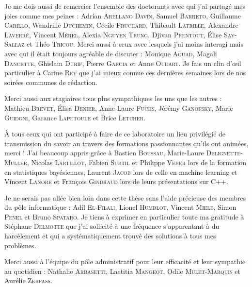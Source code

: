 Je me dois aussi de remercier l'ensemble des doctorants avec qui j'ai partagé mes joies comme mes peines : 
Adr\'ian \textsc{Arellano Dav\'in}, 
Samuel \textsc{Barreto},
Guillaume \textsc{Carillo},
Wandrille \textsc{Duchemin},
Cécile \textsc{Fruchard},
Thibault \textsc{Latrille},
Alexandre \textsc{Laverré},
Vincent \textsc{Mérel},
Alexia \textsc{Nguyen Trung},
Djivan \textsc{Prentout},
\'Elise \textsc{Say-Sallaz} et
Théo \textsc{Tricou}.
Merci aussi à ceux avec lesquels j'ai moins interagi mais avec qui il était toujours agréable de discuter : 
Monique \textsc{Aouad},
Magali \textsc{Dancette},
Ghislain \textsc{Durif},
Pierre \textsc{Garcia} et Anne \textsc{Oudart}.
Je fais un clin d'œil particulier à Carine \textsc{Rey} que j'ai mieux connue ces dernières semaines lors de nos soirées communes de rédaction.

Merci aussi aux stagiaires tous plus sympathiques les uns que les autres : Mathieu \textsc{Brevet}, \'Elisa \textsc{Denier}, Anne-Laure \textsc{Fuchs}, Jérémy \textsc{Ganofsky}, Marie \textsc{Guidoni}, Garance \textsc{Lapetoule} et Brice \textsc{Letcher}.

\`A tous ceux qui ont participé à faire de ce laboratoire un lieu privilégié de transmission du savoir au travers des formations passionnantes qu'ils ont animées, merci ! J'ai beaucoup appris gr\^ace à
Bastien \textsc{Boussau}, Marie-Laure \textsc{Delignette-Muller}, Nicolas \textsc{Lartillot}, Fabien \textsc{Subtil} et Philippe \textsc{Veber} lors de la formation en statistiques bayésiennes, Laurent \textsc{Jacob} lors de celle en machine learning et Vincent \textsc{Lanore} et François \textsc{Gindraud} lors de leurs présentations sur C++.



Je ne serais pas allée bien loin dans cette thèse sans l'aide précieuse des membres du pôle informatique : 
Adil \textsc{El-Filali},
Lionel \textsc{Humblot},
Vincent \textsc{Miele},
Simon \textsc{Penel} et
Bruno \textsc{Spataro}.
Je tiens à exprimer en particulier toute ma gratitude à Stéphane \textsc{Delmotte} que j'ai sollicité à une fréquence s'apparentant à du harcèlement et qui a systématiquement trouvé des solutions à tous mes problèmes.

Merci aussi à l'équipe du pôle administratif pour leur efficacité et leur sympathie au quotidien : 
Nathalie \textsc{Arbasetti},
Laetitia \textsc{Mangeot},
Odile \textsc{Mulet-Marquis} et
Aurélie \textsc{Zerfass}.

